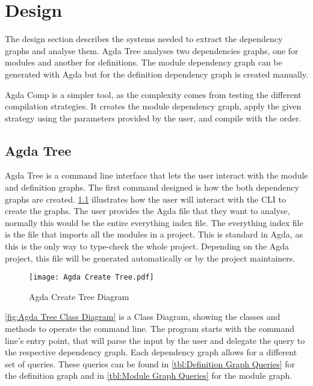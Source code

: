 
\chapter{Design}

The design section describes the systems needed to extract the dependency
graphs and analyse them. Agda Tree analyses two dependencies graphs, one for
modules and another for definitions. The module dependency graph can be
generated with Agda but for the definition dependency graph is created
manually.

Agda Comp is a simpler tool, as the complexity comes from testing the different
compilation strategies. It creates the module dependency graph, apply the
given strategy using the parameters provided by the user, and compile with the
order. 

\pagebreak

\section{Agda Tree}

Agda Tree is a command line interface that lets the user interact with the
module and definition graphs. The first command designed is how the both
dependency graphs are created. \cref{fig:Agda Create Tree Diagram} illustrates
how the user will interact with the CLI to create the graphs. The user provides
the Agda file that they want to analyse, normally this would be the entire
everything index file. The everything index file is the file that imports all
the modules in a project. This is standard in Agda, as this is the only way to
type-check the whole project. Depending on the Agda project, this file will be
generated automatically or by the project maintainers.
\begin{figure}[H]
    \centering
    \texttt{[image: Agda Create Tree.pdf]}
    \caption{Agda Create Tree Diagram}
    \label{fig:Agda Create Tree Diagram}
\end{figure} 

\pagebreak

\cref{fig:Agda Tree Class Diagram} is a Class Diagram, showing the classes and
methods to operate the command line. The program starts with the command line's
entry point, that will parse the input by the user and delegate the query to
the respective dependency graph. Each dependency graph allows for a different
set of queries. These queries can be found in \cref{tbl:Definition Graph
Queries} for the definition graph and in \cref{tbl:Module Graph Queries} for
the module graph.

